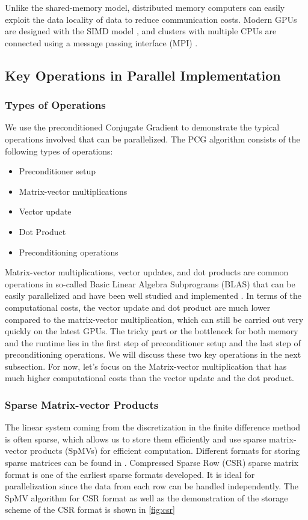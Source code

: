 Unlike the shared-memory model, distributed memory computers can easily exploit the data locality of data to reduce communication costs. Modern GPUs are designed with the SIMD model \cite{owens2008gpu}, and clusters with multiple CPUs are connected using a message passing interface (MPI) \cite{barker2015message}.


\subsection{Key Operations in Parallel Implementation}
\subsubsection{Types of Operations}

We use the preconditioned Conjugate Gradient to demonstrate the typical operations involved that can be parallelized. The PCG algorithm consists of the following types of operations:
\begin{itemize}
    \item Preconditioner setup
    \item Matrix-vector multiplications
    \item Vector update
    \item Dot Product
    \item Preconditioning operations
\end{itemize}

Matrix-vector multiplications, vector updates, and dot products are common operations in so-called Basic Linear Algebra Subprograms (BLAS) that can be easily parallelized and have been well studied and implemented \cite{10.1145/77626.79170,chtchelkanova1997parallel,freeman1992parallel}. In terms of the computational costs, the vector update and dot product are much lower compared to the matrix-vector multiplication, which can still be carried out very quickly on the latest GPUs. The tricky part or the bottleneck for both memory and the runtime lies in the first step of preconditioner setup and the last step of preconditioning operations. We will discuss these two key operations in the next subsection. For now, let's focus on the Matrix-vector multiplication that has much higher computational costs than the vector update and the dot product.

\subsubsection{Sparse Matrix-vector Products}
The linear system coming from the discretization in the finite difference method is often sparse, which allows us to store them efficiently and use sparse matrix-vector products (SpMVs) for efficient computation. Different formats for storing sparse matrices can be found in \cite{saad2003iterative}. Compressed Sparse Row (CSR) sparse matrix format is one of the earliest sparse formats developed. It is ideal for parallelization since the data from each row can be handled independently. The SpMV algorithm for CSR format as well as the demonstration of the storage scheme of the CSR format is shown in \autoref{fig:csr}

